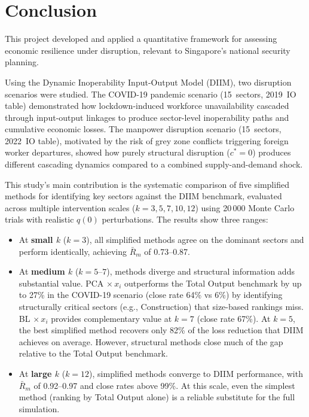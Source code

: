\chapter{Conclusion}

This project developed and applied a quantitative framework for assessing economic resilience under disruption, relevant to Singapore's national security planning.

Using the Dynamic Inoperability Input-Output Model (DIIM), two disruption scenarios were studied. The COVID-19 pandemic scenario (15~sectors, 2019~IO table) demonstrated how lockdown-induced workforce unavailability cascaded through input-output linkages to produce sector-level inoperability paths and cumulative economic losses. The manpower disruption scenario (15~sectors, 2022~IO table), motivated by the risk of grey zone conflicts triggering foreign worker departures, showed how purely structural disruption ($c^* = 0$) produces different cascading dynamics compared to a combined supply-and-demand shock.

This study's main contribution is the systematic comparison of five simplified methods for identifying key sectors against the DIIM benchmark, evaluated across multiple intervention scales ($k = 3, 5, 7, 10, 12$) using 20\,000 Monte Carlo trials with realistic $q(0)$ perturbations. The results show three ranges:

\begin{itemize}
    \item At \textbf{small $k$} ($k = 3$), all simplified methods agree on the dominant sectors and perform identically, achieving $\bar{R}_m$ of 0.73--0.87.

    \item At \textbf{medium $k$} ($k = 5$--$7$), methods diverge and structural information adds substantial value. PCA $\times\, x_i$ outperforms the Total Output benchmark by up to 27\% in the COVID-19 scenario (close rate 64\% vs 6\%) by identifying structurally critical sectors (e.g., Construction) that size-based rankings miss. BL $\times\, x_i$ provides complementary value at $k = 7$ (close rate 67\%). At $k = 5$, the best simplified method recovers only 82\% of the loss reduction that DIIM achieves on average. However, structural methods close much of the gap relative to the Total Output benchmark.

    \item At \textbf{large $k$} ($k = 12$), simplified methods converge to DIIM performance, with $\bar{R}_m$ of 0.92--0.97 and close rates above 99\%. At this scale, even the simplest method (ranking by Total Output alone) is a reliable substitute for the full simulation.
\end{itemize}

